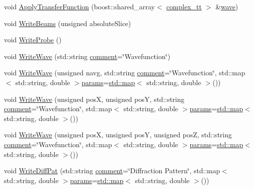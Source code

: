 \begin{DoxyCompactItemize}
\item 
void \hyperlink{class_q_s_t_e_m_1_1_c_base_wave_adc9b75dacc66099b84663ab688f5a60b}{Apply\-Transfer\-Function} (boost\-::shared\-\_\-array$<$ \hyperlink{namespace_q_s_t_e_m_afa320ea3cd2f5ff080c422f81b803a32}{complex\-\_\-tt} $>$ \&\hyperlink{sim_image_from_wave_8m_acb3ac767ec1048cf315487da2b577ca4}{wave})
\item 
void \hyperlink{class_q_s_t_e_m_1_1_c_base_wave_a18f54d7f0d241092c7761938c42350f7}{Write\-Beams} (unsigned absolute\-Slice)
\item 
void \hyperlink{class_q_s_t_e_m_1_1_c_base_wave_af123c55b2b15bbef61372c3a5d866cef}{Write\-Probe} ()
\item 
void \hyperlink{class_q_s_t_e_m_1_1_c_base_wave_ac26b9492035ebef5e8642b445e1920e4}{Write\-Wave} (std\-::string \hyperlink{image_sim_8m_aea4cc4bd8e43a7f8ebf9b0ee3da8d681}{comment}=\char`\"{}Wavefunction\char`\"{})
\item 
void \hyperlink{class_q_s_t_e_m_1_1_c_base_wave_a0d29573819f8de3425bdb1facd55f335}{Write\-Wave} (unsigned navg, std\-::string \hyperlink{image_sim_8m_aea4cc4bd8e43a7f8ebf9b0ee3da8d681}{comment}=\char`\"{}Wavefunction\char`\"{}, std\-::map$<$ std\-::string, double $>$\hyperlink{image_sim_8m_ad57b218fb254a1624c09ad71cb6b6415}{params}=\hyperlink{_displacement_params_8m_af619c74fd72bdb64d115463dff2720cd}{std\-::map}$<$ std\-::string, double $>$())
\item 
void \hyperlink{class_q_s_t_e_m_1_1_c_base_wave_aeefa9632f76cf8a819d46f34fb722700}{Write\-Wave} (unsigned pos\-X, unsigned pos\-Y, std\-::string \hyperlink{image_sim_8m_aea4cc4bd8e43a7f8ebf9b0ee3da8d681}{comment}=\char`\"{}Wavefunction\char`\"{}, std\-::map$<$ std\-::string, double $>$\hyperlink{image_sim_8m_ad57b218fb254a1624c09ad71cb6b6415}{params}=\hyperlink{_displacement_params_8m_af619c74fd72bdb64d115463dff2720cd}{std\-::map}$<$ std\-::string, double $>$())
\item 
void \hyperlink{class_q_s_t_e_m_1_1_c_base_wave_aa46dacc86af9cd51e5e6ee648ae6383a}{Write\-Wave} (unsigned pos\-X, unsigned pos\-Y, unsigned pos\-Z, std\-::string \hyperlink{image_sim_8m_aea4cc4bd8e43a7f8ebf9b0ee3da8d681}{comment}=\char`\"{}Wavefunction\char`\"{}, std\-::map$<$ std\-::string, double $>$\hyperlink{image_sim_8m_ad57b218fb254a1624c09ad71cb6b6415}{params}=\hyperlink{_displacement_params_8m_af619c74fd72bdb64d115463dff2720cd}{std\-::map}$<$ std\-::string, double $>$())
\item 
void \hyperlink{class_q_s_t_e_m_1_1_c_base_wave_a2ac2edcb737b8d3a4d08ce0a21b55bdb}{Write\-Diff\-Pat} (std\-::string \hyperlink{image_sim_8m_aea4cc4bd8e43a7f8ebf9b0ee3da8d681}{comment}=\char`\"{}Diffraction Pattern\char`\"{}, std\-::map$<$ std\-::string, double $>$\hyperlink{image_sim_8m_ad57b218fb254a1624c09ad71cb6b6415}{params}=\hyperlink{_displacement_params_8m_af619c74fd72bdb64d115463dff2720cd}{std\-::map}$<$ std\-::string, double $>$())

\end{DoxyCompactItemize}
